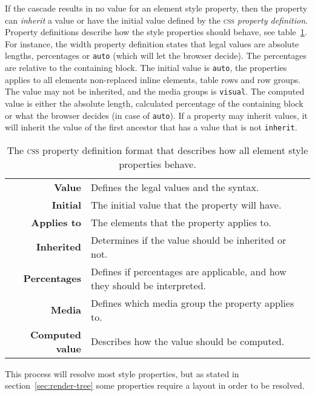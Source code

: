 \documentclass[a4paper,11pt]{kth-mag}
\newcommand{\code}[1]{\texttt{#1}}
\begin{document}
        If the cascade results in no value for an element style property, then the property can \emph{inherit} a value or have the initial value defined by the \textsc{css} \emph{property definition}.
        Property definitions describe how the style properties should behave, see table~\ref{table:css_property_definition}.
        For instance, the width property definition states that legal values are absolute lengths, percentages or \code{auto} (which will let the browser decide).
        The percentages are relative to the containing block.
        The initial value is \code{auto}, the properties applies to all elements non-replaced inline elements, table rows and row groups.
        The value may not be inherited, and the media groups is \code{visual}.
        The computed value is either the absolute length, calculated percentage of the containing block or what the browser decides (in case of \code{auto}).
        If a property may inherit values, it will inherit the value of the first ancestor that has a value that is not \code{inherit}.

        \begin{table}[ht]\center
          \tiny
          \begin{tabular}[t]{ r | l }
            \textbf{Value} & Defines the legal values and the syntax. \\
            \textbf{Initial} & The initial value that the property will have. \\
            \textbf{Applies to} & The elements that the property applies to. \\
            \textbf{Inherited} & Determines if the value should be inherited or not. \\
            \textbf{Percentages} & Defines if percentages are applicable, and how they should be interpreted. \\
            \textbf{Media} & Defines which media group the property applies to. \\
            \textbf{Computed value} & Describes how the value should be computed. \\
          \end{tabular}
          \label{table:css_property_definition}
          \caption{The \textsc{css} property definition format that describes how all element style properties behave.}
        \end{table}

        This process will resolve most style properties, but as stated in section~\ref{sec:render-tree} some properties require a layout in order to be resolved.
\end{document}

